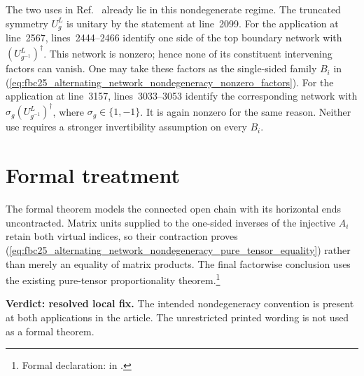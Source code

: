 \documentclass{article}
\begin{document}
The two uses in Ref.~\cite{FrancoRubio2025MPUGauging} already lie in this
nondegenerate regime.  The truncated symmetry $U^L_g$ is unitary by the
statement at line~2099.  For the application at line~2567, lines~2444--2466
identify one side of the top boundary network with
$(U^L_{g^{-1}})^\dagger$.  This network is nonzero; hence none of its
constituent intervening factors can vanish.  One may take these factors as the
single-sided family $B_i$ in
(\ref{eq:fbc25_alternating_network_nondegeneracy_nonzero_factors}).  For the
application at line~3157, lines~3033--3053 identify the corresponding network
with $\sigma_g(U^L_{g^{-1}})^\dagger$, where
$\sigma_g\in\{1,-1\}$.  It is again nonzero for the same reason.  Neither use
requires a stronger invertibility assumption on every $B_i$.

\section{Formal treatment}

The formal theorem models the connected open chain with its horizontal ends
uncontracted.  Matrix units supplied to the one-sided inverses of the
injective $A_i$ retain both virtual indices, so their contraction proves
(\ref{eq:fbc25_alternating_network_nondegeneracy_pure_tensor_equality}) rather
than merely an equality of matrix products.  The final factorwise conclusion
uses the existing pure-tensor proportionality theorem.\footnote{Formal
declaration:
 in
.}

\textbf{Verdict: resolved local fix.}
The intended nondegeneracy convention is present at both applications in the
article.  The unrestricted printed wording is not used as a formal theorem.



\end{document}
